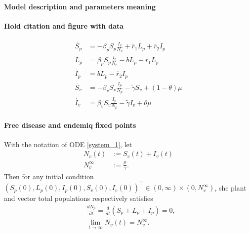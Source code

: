 

\paragraph{Model description and parameters meaning}

\paragraph{Hold citation and figure with data}
\begin{equation} 
	\label{system_1} 
	\begin{aligned} 
		\dot{S_p} &= 
			-\beta_p S_p
			\frac{I_v}{N_v} + \tilde{r_1} L_p + \tilde{r_2} I_p  
		\\ 
		\dot{L_p} &= 
			\beta_p S_p
			\frac{I_v}{N_v} - b L_p - \tilde{r_1} L_p  
		\\ 
		\dot{I_p} &= 
			b L_p - \tilde{r_2} I_p  \\ 
		\dot{S_v} &= 
			-\beta_v S_v 
			\frac{I_p}{N_p} - \tilde{\gamma} S_v
			+(1-\theta) \mu  
		\\ 
		\dot{I_v} &= 
			\beta_v S_v \frac{I_p}{N_p} 
			- \tilde{\gamma} I_v
			+ \theta \mu 
	\end{aligned} 
\end{equation} 

\paragraph{Free disease and endemiq fixed points}

\begin{theorem}\label{theorem_1}
	With the notation of ODE \eqref{system_1}, let
	\begin{equation*}
		\begin{aligned}
			N_v(t) &:= S_v(t) + I_v(t) 
		 	\\
		 	N_v^{\infty} &:= \frac{\mu}{\gamma}.
		 \end{aligned}
	\end{equation*}
	Then for any initial condition 
	$
		(S_p(0), L_p(0), I_p(0), S_v(0), I_v(0) )^\top
	 	\in {(0,\infty) \times (0, N^\infty_v)}
	$, she plant and vector total populations respectively satisfies
	\begin{equation*}
		\begin{aligned}
			& \frac{d N_p}{dt} =
				\frac{d}{dt}(S_p + L_p + I_p) = 0,
			\\
			& \lim_{t\to \infty}
				N_v(t) = N_v^{\infty}.
		\end{aligned}
	\end{equation*}
\end{theorem}

